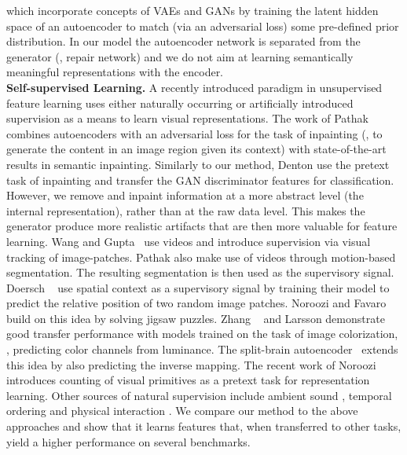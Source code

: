 \documentclass[10pt,twocolumn,letterpaper]{article}
\begin{document}
which incorporate concepts of VAEs and GANs by training the latent hidden space of an autoencoder to match (via an adversarial loss) some pre-defined prior distribution. 
In our model the autoencoder network is separated from the generator (\ie, repair network) and we do not aim at learning semantically meaningful representations with the encoder. \\
\textbf{Self-supervised Learning.}
A recently introduced paradigm in unsupervised feature learning uses either naturally occurring or artificially introduced supervision as a means to learn visual representations.
The work of Pathak \etal~\cite{pathak2016context} combines autoencoders with an adversarial loss for the task of inpainting (\ie, to generate the content in an image region given its context) with state-of-the-art results in semantic inpainting. Similarly to our method, Denton \etal \cite{denton2016semi} use the pretext task of inpainting and transfer the GAN discriminator features for classification. However, we remove and inpaint information at a more abstract level (the internal representation), rather than at the raw data level. This makes the generator produce more realistic artifacts that are then more valuable for feature learning. Wang and Gupta~\cite{wang2015unsupervised} use videos and introduce supervision via visual tracking of image-patches. Pathak \etal \cite{pathakCVPR17learning} also make use of videos through motion-based segmentation. The resulting segmentation is then used as the supervisory signal. 
Doersch \etal~\cite{doersch2015unsupervised} use spatial context as a supervisory signal by training their model to predict the relative position of two random image patches.
Noroozi and Favaro~\cite{noroozi2016unsupervised} build on this idea by solving jigsaw puzzles.
Zhang \etal~\cite{zhang2016colorful} and Larsson \etal \cite{larsson2017colorproxy} demonstrate good transfer performance with models trained on the task of image colorization, \ie, predicting color channels from luminance. The split-brain autoencoder~\cite{zhang2016split} extends this idea by also predicting the inverse mapping.
The recent work of Noroozi \etal~\cite{noroozi2017representation} introduces counting of visual primitives as a pretext task for representation learning. Other sources of natural supervision include ambient sound \cite{owens2016ambient}, temporal ordering \cite{misra2016shuffle} and physical interaction \cite{pinto2016curious}. 
We compare our method to the above approaches and show that it learns features that, when transferred to other tasks, yield a higher performance on several benchmarks.
\end{document}
